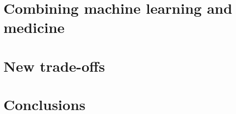 \documentclass[11pt,english]{article}
\begin{document}
\section{Combining machine learning and medicine}
\label{combination}


\section{New trade-offs}
\label{new_tradeoff}


\section{Conclusions}
\label{conclusions}


%
\clearpage




\printbibliography
\end{document}
